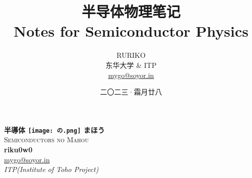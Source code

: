 \documentclass{report}
\title{\Huge\textbf{半导体物理笔记}\\ \vspace{1ex}\LARGE Notes for Semiconductor Physics}
\author{\Large RURIKO\vspace{2ex} \\ \vspace{2ex}东华大学 \& ITP \\ \href{mailto:mygo@soyor.in}{mygo@soyor.in}}
\date{二〇二三·霜月廿八}
\numberwithin{equation}{section}
\begin{document}
\begin{titlepage}
\begin{center}
  {\Huge\bfseries 半導体 \texttt{[image: の.png]} まほう}\\[2ex]
  \textsc{\LARGE Semiconductors no Mahou}\\[6.5ex]
  {\large\bfseries riku0w0}           \\
  \vspace{4ex}
  \href{mailto:mygo@soyor.in}{mygo@soyor.in}                    \\[5pt]
  \textit{ITP(Institute of Toho Project)}                \\[0.8cm]
  \begin{figure}[H]
      \centering
\iffalse
{} %

\begin{tikzpicture}[x=0.75pt,y=0.75pt,yscale=-1,xscale=1]


\end{tikzpicture}
\end{figure}
\end{center}
\end{titlepage}
\end{document}
